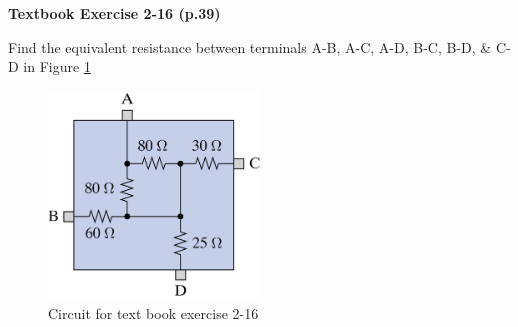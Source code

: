 \documentclass{handout}
\begin{document}

\clearpage

\textbf{Textbook Exercise 2-16 (p.39)}

Find the equivalent resistance between terminals A-B, A-C, A-D, B-C, B-D, \& C-D in Figure \ref{fig: Ex2_16}

\begin{figure}[h t b]
\centering
\includegraphics[width=0.5\textwidth]{Ex2_16.jpg}
\caption{Circuit for text book exercise 2-16}
\label{fig: Ex2_16}
\end{figure}

\end{document}

